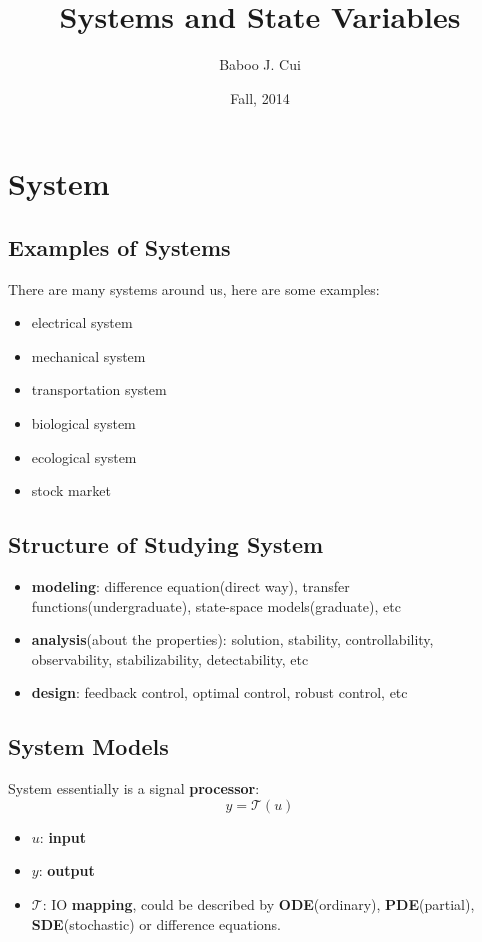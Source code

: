 \documentclass[10pt,a4paper,oneside]{article}
\author{Baboo J. Cui}
\title{Systems and State Variables}
\date{Fall, 2014}
\begin{document}
\maketitle
\tableofcontents

\newpage

\section{System}

\subsection{Examples of Systems}
There are many systems around us, here are some examples:
\begin{itemize}
	\item electrical system
	\item mechanical system
	\item transportation system
	\item biological system
	\item ecological system
	\item stock market
\end{itemize}

\subsection{Structure of Studying System}
\begin{itemize}
	\item \textbf{modeling}: difference equation(direct way), transfer functions(undergraduate), state-space models(graduate), etc
	\item \textbf{analysis}(about the properties): solution, stability, controllability, observability, stabilizability, detectability, etc
	\item \textbf{design}: feedback control, optimal control, robust control, etc
\end{itemize}

\subsection{System Models}
System essentially is a signal \textbf{processor}:
\[
y = \mathcal{T}(u)
\]
\begin{itemize}
	\item $u$: \textbf{input}
	\item $y$: \textbf{output}
	\item $\mathcal{T}$: IO \textbf{mapping}, could be described by \textbf{ODE}(ordinary), \textbf{PDE}(partial), \textbf{SDE}(stochastic) or difference equations.
\end{itemize}
\end{document}
